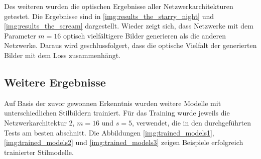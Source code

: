 Des weiteren wurden die optischen Ergebnisse aller Netzwerkarchitekturen getestet. Die Ergebnisse sind in \ref{img:results_the_starry_night} und \ref{img:results_the_scream} dargestellt. Wieder zeigt sich, dass Netzwerke mit dem Parameter $ m = 16 $ optisch vielfältigere Bilder generieren als die anderen Netzwerke. Daraus wird geschlussfolgert, dass die optische Vielfalt der generierten Bilder mit dem Loss zusammenhängt.

\subsection{Weitere Ergebnisse}

Auf Basis der zuvor gewonnen Erkenntnis wurden weitere Modelle mit unterschiedlichen Stilbildern trainiert. Für das Training wurde jeweils die Netzwerkarchitektur 2, $ m = 16 $ und $ s = 5 $, verwendet, die in den durchgeführten Tests am besten abschnitt. Die Abbildungen \ref{img:trained_models1}, \ref{img:trained_models2} und \ref{img:trained_models3} zeigen Beispiele erfolgreich trainierter Stilmodelle.